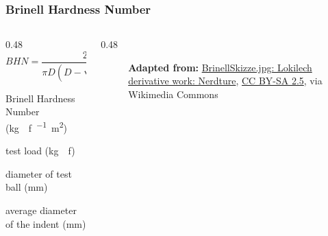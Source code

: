 \begin{frame}
	\frametitle{Brinell Hardness Number}
    \begin{columns}
        \begin{column}{0.48\linewidth}
            \[BHN=\dfrac{2P}{\pi D(D-\sqrt{D^2 - d^2})}\]
            \begin{description}[<+- | alert@+>]
                \item[$BHN$] Brinell Hardness Number (\unit{\kilo\gram{}f\per\milli\square\meter})
                \item[$P$] test load (\unit{\kilo\gram{}f})
                \item[$D$] diameter of test ball (\unit{\milli\meter})
                \item[$d$] average diameter of the indent (\unit{\milli\meter})
            \end{description}
        \end{column}
        \begin{column}{0.48\linewidth}
            \begin{figure}
                \centering
                \resizebox{0.375\linewidth}{!}{
                    
                }

                \vspace{0.5em}
                {\tiny \textbf{Adapted from:} \href{https://commons.wikimedia.org/wiki/File:BrinellHardness.svg}{BrinellSkizze.jpg: Lokilech derivative work: Nerdture}, \href{https://creativecommons.org/licenses/by-sa/2.5}{CC BY-SA 2.5}, via Wikimedia Commons\par}
            \end{figure}
        \end{column}
    \end{columns}
\end{frame}

